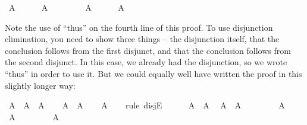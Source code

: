 \begin{isabellebody}
\ {\isachardoublequoteopen}A{\isachardoublequoteclose}\isanewline
\ \ \ \ \isamarkupfalse%
\ {\isachardoublequoteopen}A{\isachardoublequoteclose}\isacommand{{\isachardot}}\isamarkupfalse%
\isanewline
\ \ \isamarkupfalse%
\isanewline
\ \ \ \ \isamarkupfalse%
\ {\isachardoublequoteopen}A{\isachardoublequoteclose}\isanewline
\ \ \ \ \isamarkupfalse%
\ {\isachardoublequoteopen}A{\isachardoublequoteclose}\isacommand{{\isachardot}}\isamarkupfalse%
\isanewline
\ \ \isamarkupfalse%
\isanewline
{}\isamarkupfalse%
%
\endisatagproof
{\isafoldproof}%
%
\isadelimproof
%
\endisadelimproof
%
\begin{isamarkuptext}%
Note the use of ``thus'' on the fourth line of this proof. To use disjunction elimination,
you need to show three things -- the disjunction itself, that the conclusion follows from the first
disjunct, and that the conclusion follows from the second disjunct. In this case, we already had the
disjunction, so we wrote ``thus'' in order to use it. But we could equally well have written the
proof in this slightly longer way:%
\end{isamarkuptext}\isamarkuptrue%
\isamarkupfalse%
\ {\isachardoublequoteopen}A\ {\isasymor}\ A\ {\isasymlongrightarrow}\ A{\isachardoublequoteclose}\isanewline
%
\isadelimproof
%
\endisadelimproof
%
\isatagproof
{}\isamarkupfalse%
\isanewline
\ \ \isamarkupfalse%
\ {\isachardoublequoteopen}A\ {\isasymor}\ A{\isachardoublequoteclose}\isanewline
\ \ \isamarkupfalse%
\ {\isachardoublequoteopen}A{\isachardoublequoteclose}\isanewline
\ \ \isamarkupfalse%
\ {\isacharparenleft}rule\ disjE{\isacharparenright}\isanewline
\ \ \ \ \isamarkupfalse%
\ {\isachardoublequoteopen}A\ {\isasymor}\ A{\isachardoublequoteclose}\ \isamarkupfalse%
\ {\isacharbackquoteopen}A\ {\isasymor}\ A{\isacharbackquoteclose}\isacommand{{\isachardot}}\isamarkupfalse%
\isanewline
\ \ \isamarkupfalse%
\isanewline
\ \ \ \ \isamarkupfalse%
\ {\isachardoublequoteopen}A{\isachardoublequoteclose}\isanewline
\ \ \ \ \isamarkupfalse%
\ {\isachardoublequoteopen}A{\isachardoublequoteclose}\isacommand{{\isachardot}}\isamarkupfalse%
\isanewline
\ \ \isamarkupfalse%
\isanewline
\ \ \ \ \isamarkupfalse%
\ {\isachardoublequoteopen}A{\isachardoublequoteclose}\isanewline
\ \ \ \ \isamarkupfalse%

\end{isabellebody}

